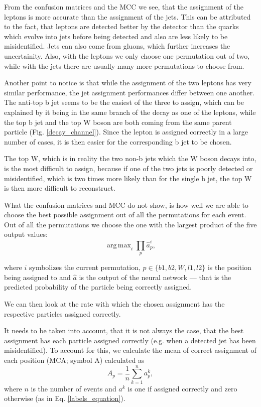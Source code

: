 \documentclass{ctuthesis}
\DeclareMathOperator*{\argmax}{arg\,max}
\begin{document}
From the confusion matrices and the MCC we see, that the assignment of the leptons is more accurate than the assignment of the jets. This can be attributed to the fact, that leptons are detected better by the detector than the quarks which evolve into jets before being detected and also are less likely to be misidentified. Jets can also come from gluons, which further increases the uncertainity. Also, with the leptons we only choose one permutation out of two, while with the jets there are usually many more permutations to choose from. 

Another point to notice is that while the assignment of the two leptons has very similar performance, the jet assignment performances differ between one another. The anti-top b jet seems to be the easiest of the three to assign, which can be explained by it being in the same branch of the decay as one of the leptons, while the top b jet and the top W boson are both coming from the same parent particle (Fig. \ref{decay_channel}). Since the lepton is assigned correctly in a large number of cases, it is then easier for the corresponding b jet to be chosen.

The top W, which is in reality the two non-b jets which the W boson decays into, is the most difficult to assign, because if one of the two jets is poorly detected or misidentified, which is two times more likely than for the single b jet, the top W is then more difficult to reconstruct.

What the confusion matrices and MCC do not show, is how well we are able to choose the best possible assignment out of all the permutations for each event. Out of all the permutations we choose the one with the largest product of the five output values:
\begin{equation}
    \argmax_{i}\prod_{p} \hat{a}_p^i,
\label{product_label}
\end{equation}

where $i$ symbolizes the current permutation, $p \in \{b1, b2, W, l1, l2\}$ is the position being assigned to and $\hat{a}$ is the output of the neural network — that is the predicted probability of the particle being correctly assigned.

We can then look at the rate with which the chosen assignment has the respective particles assigned correctly.

It needs to be taken into account, that it is not always the case, that the best assignment has each particle assigned correctly (e.g. when a detected jet has been misidentified). To account for this, we calculate the mean of correct assignment of each position (MCA; symbol A) calculated as
\begin{equation}
    {A}_p = \frac{1}{n} \sum_{k=1}^n a_p^k,
\end{equation}
where $n$ is the number of events and $a^k$ is one if assigned correctly and zero otherwise (as in Eq. \ref{labels_equation}).
\end{document}
